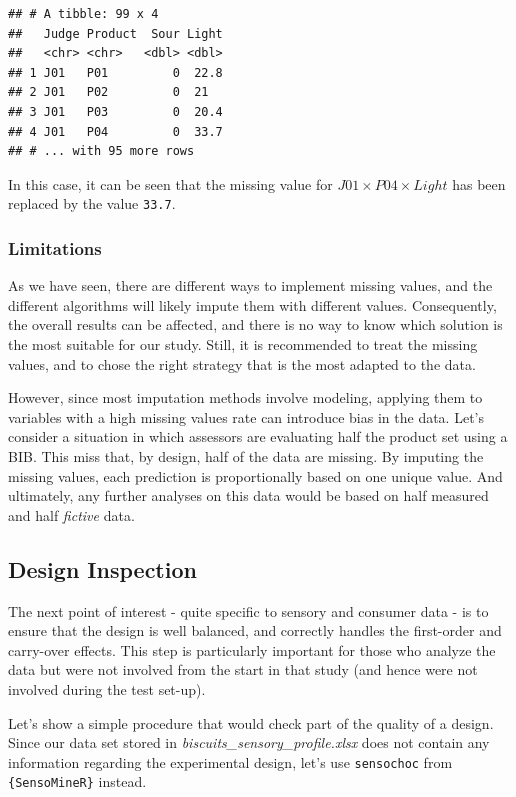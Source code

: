\documentclass[
]{krantz}
\begin{document}
\begin{verbatim}
## # A tibble: 99 x 4
##   Judge Product  Sour Light
##   <chr> <chr>   <dbl> <dbl>
## 1 J01   P01         0  22.8
## 2 J01   P02         0  21  
## 3 J01   P03         0  20.4
## 4 J01   P04         0  33.7
## # ... with 95 more rows
\end{verbatim}

In this case, it can be seen that the missing value for \(J01\times{P04}\times{Light}\) has been replaced by the value \texttt{33.7}.

\hypertarget{limitations}{%
\subsubsection*{Limitations}\label{limitations}}


As we have seen, there are different ways to implement missing values, and the different algorithms will likely impute them with different values. Consequently, the overall results can be affected, and there is no way to know which solution is the most suitable for our study. Still, it is recommended to treat the missing values, and to chose the right strategy that is the most adapted to the data.

However, since most imputation methods involve modeling, applying them to variables with a high missing values rate can introduce bias in the data. Let's consider a situation in which assessors are evaluating half the product set using a BIB. This miss that, by design, half of the data are missing. By imputing the missing values, each prediction is proportionally based on one unique value. And ultimately, any further analyses on this data would be based on half measured and half \emph{fictive} data.

\hypertarget{design-inspection}{%
\subsection{Design Inspection}\label{design-inspection}}

The next point of interest - quite specific to sensory and consumer data - is to ensure that the design is well balanced, and correctly handles the first-order and carry-over effects. This step is particularly important for those who analyze the data but were not involved from the start in that study (and hence were not involved during the test set-up).

Let's show a simple procedure that would check part of the quality of a design. Since our data set stored in \emph{biscuits\_sensory\_profile.xlsx} does not contain any information regarding the experimental design, let's use \texttt{sensochoc} from \texttt{\{SensoMineR\}} instead.
\end{document}
